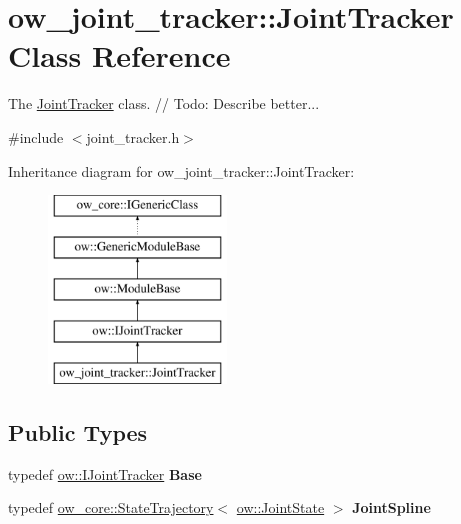 \hypertarget{classow__joint__tracker_1_1JointTracker}{}\section{ow\+\_\+joint\+\_\+tracker\+:\+:Joint\+Tracker Class Reference}
\label{classow__joint__tracker_1_1JointTracker}


The \hyperlink{classow__joint__tracker_1_1JointTracker}{Joint\+Tracker} class. // Todo\+: Describe better...  




{\ttfamily \#include $<$joint\+\_\+tracker.\+h$>$}

Inheritance diagram for ow\+\_\+joint\+\_\+tracker\+:\+:Joint\+Tracker\+:\begin{figure}[H]
\begin{center}
\leavevmode
\includegraphics[height=5.000000cm]{d5/d36/classow__joint__tracker_1_1JointTracker}
\end{center}
\end{figure}
\subsection*{Public Types}
\begin{DoxyCompactItemize}
\item 
typedef \hyperlink{classow_1_1IJointTracker}{ow\+::\+I\+Joint\+Tracker} {\bfseries Base}\hypertarget{classow__joint__tracker_1_1JointTracker_a0b9d51eeaad5e0f188cab05a615991e5}{}\label{classow__joint__tracker_1_1JointTracker_a0b9d51eeaad5e0f188cab05a615991e5}

\item 
typedef \hyperlink{classow__core_1_1StateTrajectory}{ow\+\_\+core\+::\+State\+Trajectory}$<$ \hyperlink{classow__core_1_1JointState}{ow\+::\+Joint\+State} $>$ {\bfseries Joint\+Spline}\hypertarget{classow__joint__tracker_1_1JointTracker_a3be62c0a11ba93ecba1afbc9811049b2}{}\label{classow__joint__tracker_1_1JointTracker_a3be62c0a11ba93ecba1afbc9811049b2}

\end{DoxyCompactItemize}
